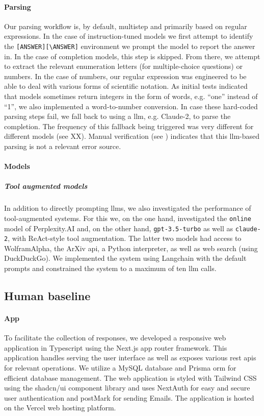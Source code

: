 \documentclass[11pt, oneside]{article}
\begin{document}
\paragraph{Parsing}
Our parsing workflow is, by default, multistep and primarily based on regular expressions.
In the case of instruction-tuned models we first attempt to identify the \texttt{[ANSWER][\textbackslash ANSWER]} environment we prompt the model to report the answer in.
In the case of completion models, this step is skipped. From there, we attempt to extract the relevant enumeration letters (for multiple-choice questions) or numbers.
In the case of numbers, our regular expression was engineered to be able to deal with various forms of scientific notation.
As initial tests indicated that models sometimes return integers in the form of words, e.g. \enquote{one} instead of \enquote{1}, we also implemented a word-to-number conversion.
In case these hard-coded parsing steps fail, we fall back to using a \gls{llm}, e.g. Claude-2, to parse the completion.
The frequency of this fallback being triggered was very different for different models (see XX).
Manual verification (see ) indicates that this \gls{llm}-based parsing is not a relevant error source.

\paragraph{Models}


\subparagraph{Tool augmented models}
In addition to directly prompting \glspl{llm}, we also investigated the performance of tool-augmented systems.
For this we, on the one hand, investigated the \texttt{online} model of Perplexity.AI and, on the other hand, \texttt{gpt-3.5-turbo} as well as \texttt{claude-2}, with ReAct-style tool augmentation.\cite{yao2023react}
The latter two models had access to WolframAlpha, the ArXiv \gls{api}, a Python interpreter, as well as web search (using DuckDuckGo).
We implemented the system using Langchain with the default prompts and constrained the system to a maximum of ten \gls{llm} calls.


\subsection{Human baseline}

\paragraph{App} To facilitate the collection of responses, we developed a responsive web application in Typescript using the Next.js\cite{nextjs} app router framework.
This application handles serving the user interface as well as exposes various \gls{rest} \glspl{api} for relevant operations.
We utilize a MySQL\cite{mysql} database and Prisma \gls{orm}\cite{prisma} for efficient database management.
The web application is styled with Tailwind CSS\cite{tailwindcss} using the shadcn/ui component library and uses NextAuth\cite{nextauth} for easy and secure user authentication and postMark for sending Emails.
The application is hosted on the Vercel web hosting platform.
\end{document}
